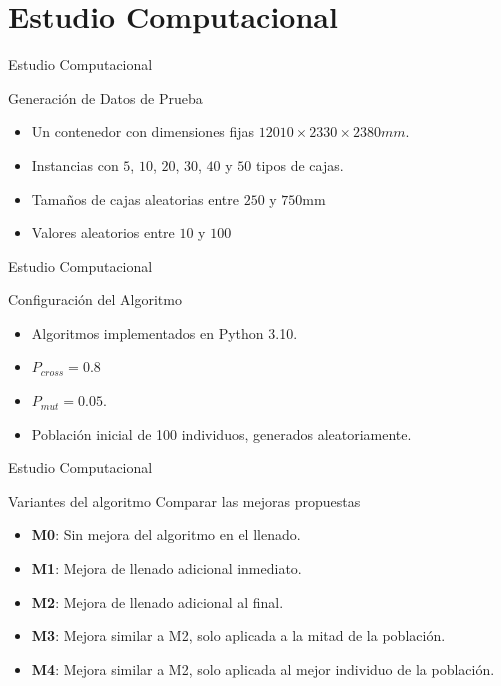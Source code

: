 \documentclass[handout]{beamer}
\begin{document}
\section[Experimentación]{Estudio Computacional}

\begin{frame}{Estudio Computacional}
    \begin{exampleblock}{Generación de Datos de Prueba}
        \begin{itemize}[<+-| alert@+>]
            \item Un contenedor con dimensiones fijas $12010 \times 2330 \times 2380 mm$.
            \item Instancias con $5$, $10$, $20$, $30$, $40$ y $50$ tipos de cajas.
            \item Tamaños de cajas aleatorias entre $250$ y $750$mm
            \item Valores aleatorios entre $10$ y $100$
        \end{itemize}
    \end{exampleblock}
\end{frame}

\begin{frame}{Estudio Computacional}
    \begin{exampleblock}{Configuración del Algoritmo}
        \begin{itemize}[<+-| alert@+>]
            \item Algoritmos implementados en Python 3.10.
            \item $P_{cross}=0.8$
            \item $P_{mut}=0.05$.
            \item Población inicial de 100 individuos, generados aleatoriamente.
        \end{itemize}
    \end{exampleblock}
\end{frame}

\begin{frame}{Estudio Computacional}
    \begin{exampleblock}{Variantes del algoritmo}
        Comparar las mejoras propuestas
        \begin{itemize}[<+-| alert@+>]
            \item \textbf{M0}: Sin mejora del algoritmo en el llenado.
            \item \textbf{M1}: Mejora de llenado adicional inmediato.
            \item \textbf{M2}: Mejora de llenado adicional al final.
            \item \textbf{M3}: Mejora similar a M2, solo aplicada a la mitad de la población.
            \item \textbf{M4}: Mejora similar a M2, solo aplicada al mejor individuo de la población.
        \end{itemize}
    \end{exampleblock}
\end{frame}
\end{document}
